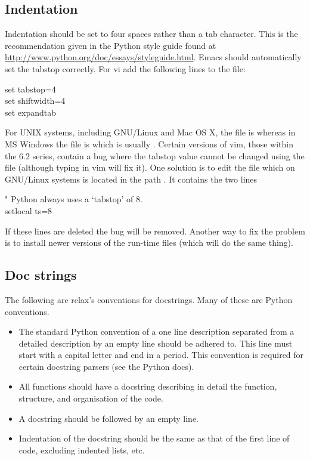 \subsection{Indentation}

Indentation should be set to four spaces rather than a tab character.
This is the recommendation given in the Python style guide found at \url{http://www.python.org/doc/essays/styleguide.html}.
Emacs should automatically set the tabstop correctly.
For vi add the following lines to the  file:

\begin{exampleenv}
set tabstop=4 \\
set shiftwidth=4 \\
set expandtab
\end{exampleenv}

For UNIX systems, including GNU/Linux and Mac OS X, the  file is  whereas in MS Windows the file is  which is usually .
Certain versions of vim, those within the 6.2 series, contain a bug where the tabstop value cannot be changed using the  file (although typing  in vim will fix it).
One solution is to edit the file  which on GNU/Linux systems is located in the path .
It contains the two lines

\begin{exampleenv}
" Python always uses a `tabstop' of 8. \\
setlocal ts=8
\end{exampleenv}

If these lines are deleted the bug will be removed.
Another way to fix the problem is to install newer versions of the run-time files (which will do the same thing).



\subsection{Doc strings}

The following are relax's conventions for docstrings.
Many of these are Python conventions.
\begin{itemize}
  \item The standard Python convention of a one line description separated from a detailed description by an empty line should be adhered to.
    This line must start with a capital letter and end in a period.
    This convention is required for certain docstring parsers (see the Python docs).
  \item All functions should have a docstring describing in detail the function, structure, and organisation of the code.
  \item A docstring should be followed by an empty line.
  \item Indentation of the docstring should be the same as that of the first line of code, excluding indented lists, etc.
\end{itemize}

